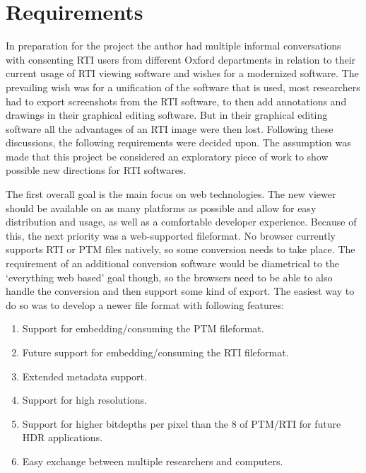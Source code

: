 \section{Requirements}
In preparation for the project the author had multiple informal conversations
with consenting RTI users from different Oxford departments in relation to their
current usage of RTI viewing software and wishes for a modernized software. The prevailing wish was for a unification of the software that is used, most
researchers had to export screenshots from the RTI software, to then add
annotations and drawings in their graphical editing software. But in their
graphical editing software all the advantages of an RTI image were then lost.
Following these discussions, the following requirements were decided upon.
The assumption was made that this project be considered an exploratory piece of work
to show possible new directions for RTI softwares.

The first overall goal is the main focus on web technologies. The new viewer
should be available on as many platforms as possible and allow for easy
distribution and usage, as well as a comfortable developer experience. Because of this, the next priority was a web-supported fileformat. No browser currently supports
RTI or PTM files natively,  so some conversion needs to take place. The
requirement of an additional conversion software would be diametrical to the
`everything web based' goal though, so the browsers need to be able to also
handle the conversion and then support some kind of export. The easiest way to
do so was to develop a newer file format with following features:

\begin{enumerate}
\item Support for embedding/consuming the PTM\cite*{library_of_congress_polynomial_2018}  fileformat.
\item Future support for embedding/consuming the RTI\cite*{library_of_congress_reflectance_2018} fileformat.
\item Extended metadata support.
\item Support for high resolutions.
\item Support for higher bitdepths per pixel than the 8 of PTM/RTI for future
  HDR applications.
\item Easy exchange between multiple researchers and computers.
\end{enumerate}


